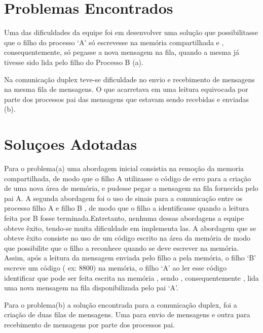 \section{Problemas Encontrados}
Uma das dificuldades da equipe foi em desenvolver uma solução que possibilitasse que o filho do processo ‘A’ só escrevesse na memória compartilhada e , consequentemente, só pegasse a nova mensagem na fila, quando a mesma já tivesse sido lida pelo filho  do Processo B (a).

Na comunicação duplex teve-se dificuldade no envio e recebimento de mensagens na mesma fila de mensagens. O que acarretava em uma leitura equivocada por parte dos processos pai das mensagens que estavam sendo recebidas e enviadas (b).

\section{Soluçoes Adotadas}
Para o problema(a) uma abordagem inicial consistia na remoção da memoria compartilhada, de modo que o filho A utilizasse o código de erro para a criação de uma nova área de memória, e pudesse pegar a mensagem na fila fornecida pelo pai A.  A segunda abordagem foi o uso de sinais para a comunicação entre os processo filho A e filho B , de modo que o filho a identificasse quando a leitura feita por B fosse terminada.Entretanto, nenhuma dessas abordagens a equipe obteve êxito, tendo-se muita dificuldade em implementa las. A abordagem que se obteve êxito consiste no uso de um código escrito na área da memória de modo que possibilite que o filho a reconhece quando se deve escrever na memória. Assim, após a leitura da mensagem enviada pelo filho a pela memória, o filho ‘B’ escreve um código ( ex: 8800) na memória, o filho ‘A’ ao ler esse código identificar que pode ser feita escrita na memória , sendo , consequentemente , lida uma nova mensagem na fila disponibilizada pelo pai ‘A’.

Para o problema(b) a solução encontrada para a comunicação duplex, foi a criação de duas filas de mensagens. Uma para envio de mensagens e outra para recebimento de mensagens por parte dos processos pai.


 	